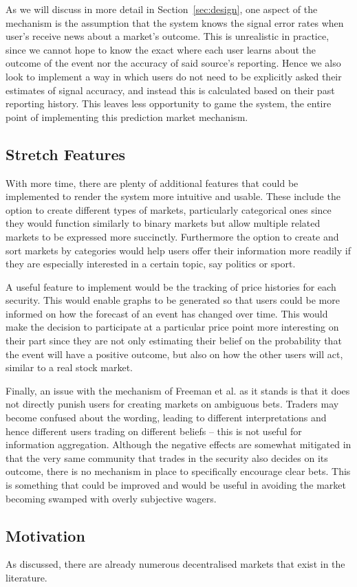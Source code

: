 As we will discuss in more detail in Section~\ref{sec:design}, one aspect of
the mechanism is the assumption that the system knows the signal error rates
when user's receive news about a market's outcome. This is unrealistic in
practice, since we cannot hope to know the exact where each user learns about
the outcome of the event nor the accuracy of said source's reporting. Hence we
also look to implement a way in which users do not need to be explicitly asked
their estimates of signal accuracy, and instead this is calculated based on
their past reporting history. This leaves less opportunity to game the system,
the entire point of implementing this prediction market mechanism.

\subsection{Stretch Features}

With more time, there are plenty of additional features that could be
implemented to render the system more intuitive and usable. These include the
option to create different types of markets, particularly categorical ones
since they would function similarly to binary markets but allow multiple
related markets to be expressed more succinctly. Furthermore the option to
create and sort markets by categories would help users offer their information
more readily if they are especially interested in a certain topic, say politics
or sport.

A useful feature to implement would be the tracking of price histories for each
security. This would enable graphs to be generated so that users could be more
informed on how the forecast of an event has changed over time. This would make
the decision to participate at a particular price point more interesting on
their part since they are not only estimating their belief on the probability
that the event will have a positive outcome, but also on how the other users
will act, similar to a real stock market.

Finally, an issue with the mechanism of Freeman et al. as it stands is that it
does not directly punish users for creating markets on ambiguous bets. Traders
may become confused about the wording, leading to different interpretations and
hence different users trading on different beliefs -- this is not useful for
information aggregation. Although the negative effects are somewhat mitigated
in that the very same community that trades in the security also decides on its
outcome, there is no mechanism in place to specifically encourage clear bets.
This is something that could be improved and would be useful in avoiding the
market becoming swamped with overly subjective wagers.

\subsection{Motivation}

As discussed, there are already numerous decentralised markets that exist in
the literature.
